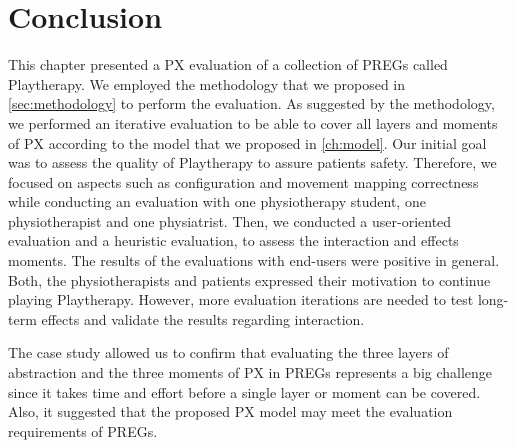 \section{Conclusion}
This chapter presented a \ac{PX} evaluation of a collection of \acp{PREG} called Playtherapy. We employed the methodology that we proposed in \autoref{sec:methodology} to perform the evaluation. As suggested by the methodology, we performed an iterative evaluation to be able to cover all layers and moments of \ac{PX} according to the model that we proposed in \autoref{ch:model}. Our initial goal was to assess the quality of Playtherapy to assure patients safety. Therefore, we focused on aspects such as configuration and movement mapping correctness while conducting an evaluation with one physiotherapy student, one physiotherapist and one physiatrist. Then, we conducted a user-oriented evaluation and a heuristic evaluation, to assess the interaction and effects moments. The results of the evaluations with end-users were positive in general. Both, the physiotherapists and patients expressed their motivation to continue playing Playtherapy. However, more evaluation iterations are needed to test long-term effects and validate the results regarding interaction. 

The case study allowed us to confirm that evaluating the three layers of abstraction and the three moments of \ac{PX} in \acp{PREG} represents a big challenge since it takes time and effort before a single layer or moment can be covered. Also, it suggested that the proposed \ac{PX} model may meet the evaluation requirements of \acp{PREG}.